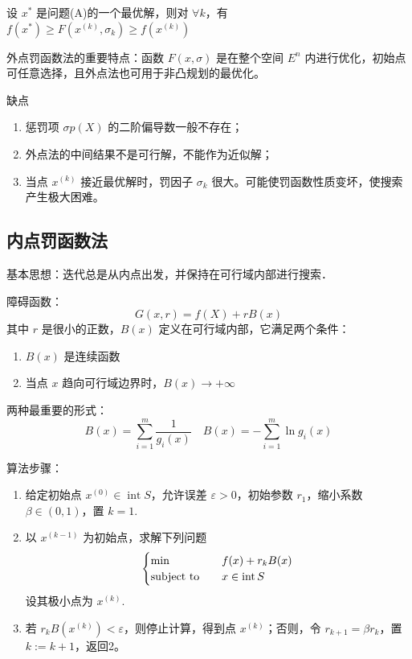 \begin{theorem}
    设 $x^*$ 是问题(A)的一个最优解，则对 $\forall k$，有$f(x^*) \ge F(x^{(k)}, \sigma_k) \ge f(x^{(k)})$
\end{theorem}

\begin{remark}
    外点罚函数法的重要特点：函数 $F(x, \sigma)$ 是在整个空间 $E^n$ 内进行优化，初始点可任意选择，且外点法也可用于非凸规划的最优化。

    缺点\begin{enumerate}
        \item 惩罚项 $\sigma p(X)$ 的二阶偏导数一般不存在；
        \item 外点法的中间结果不是可行解，不能作为近似解；
        \item 当点 $x^{(k)}$ 接近最优解时，罚因子 $\sigma_k$ 很大。可能使罚函数性质变坏，使搜索产生极大困难。
    \end{enumerate}
\end{remark}

\subsection{内点罚函数法}
基本思想：迭代总是从内点出发，并保持在可行域内部进行搜索．

\begin{remark}
    障碍函数：\[G(x, r) = f(X) + rB(x)\]
    其中 $r$ 是很小的正数，$B(x)$ 定义在可行域内部，它满足两个条件：\begin{enumerate}
        \item $B(x)$ 是连续函数
        \item 当点 $x$ 趋向可行域边界时，$B(x) \to +\infty$
    \end{enumerate}
    两种最重要的形式：\[B(x) = \sum_{i = 1}^m \frac{1}{g_i(x)} \quad B(x) = -\sum_{i = 1}^m\ln g_i(x)\]
\end{remark}

\begin{remark}
    算法步骤：\begin{enumerate}
        \item 给定初始点 $x^{(0)} \in \operatorname{int} S$，允许误差 $\varepsilon > 0$，初始参数 $r_1$，缩小系数 $\beta\in (0, 1)$，置 $k=1$.
        \item 以 $x^{(k - 1)}$ 为初始点，求解下列问题\[\begin{cases}
            \min \quad &f(x) + r_kB(x)\\
            \operatorname{subject\ to} \quad &x \in \operatorname{int} S
        \end{cases}\]设其极小点为 $x^{(k)}$.
        \item 若 $r_kB(x^{(k)}) < \varepsilon$，则停止计算，得到点 $x^{(k)}$；否则，令 $r_{k + 1} = \beta r_k$，置 $k := k + 1$，返回2。
    \end{enumerate}
\end{remark}

